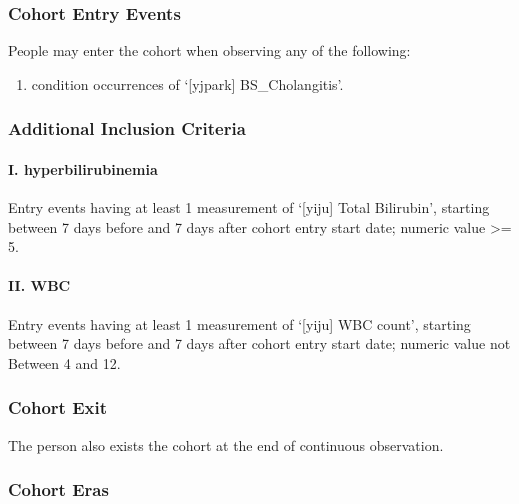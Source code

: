 \documentclass[
  12pt,
]{article}
\providecommand{\tightlist}{%
  \setlength{\itemsep}{0pt}\setlength{\parskip}{0pt}}
\begin{document}
\subsubsection{Cohort Entry Events}\label{cohort-entry-events-3}

People may enter the cohort when observing any of the following:

\begin{enumerate}
\def\labelenumi{\arabic{enumi}.}
\tightlist
\item
  condition occurrences of `{[}yjpark{]} BS\_Cholangitis'.
\end{enumerate}

\subsubsection{Additional Inclusion Criteria}\label{additional-inclusion-criteria-2}

\paragraph*{I. hyperbilirubinemia}\label{i.-hyperbilirubinemia}

Entry events having at least 1 measurement of `{[}yiju{]} Total Bilirubin', starting between 7 days before and 7 days after cohort entry start date; numeric value \textgreater= 5.

\paragraph*{II. WBC}\label{ii.-wbc}

Entry events having at least 1 measurement of `{[}yiju{]} WBC count', starting between 7 days before and 7 days after cohort entry start date; numeric value not Between 4 and 12.

\subsubsection{Cohort Exit}\label{cohort-exit-3}

The person also exists the cohort at the end of continuous observation.

\subsubsection{Cohort Eras}\label{cohort-eras-3}
\end{document}
